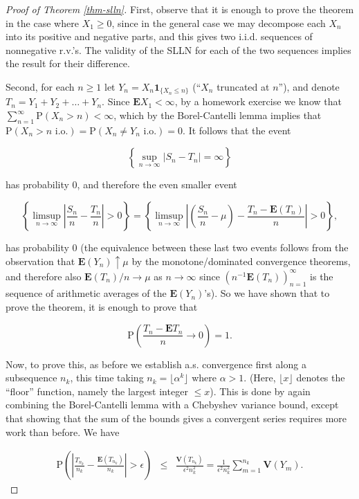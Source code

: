 \documentclass[11pt]{report}
\theoremstyle{plain}
\theoremstyle{definition}
\begin{document}
\begin{proof}[Proof of Theorem \ref{thm-slln}]
First, observe that it is enough to prove the theorem
in the case where $X_1\ge 0$, since in the general
case we may decompose each $X_n$ into its positive
and negative parts, and this gives two i.i.d.
sequences of nonnegative r.v.'s. The validity of the
SLLN for each of the two sequences implies the result
for their difference.

Second, for each $n\ge 1$ let
$Y_n = X_n \mathbf{1}_{\{X_n\le n\}}$ (``$X_n$
truncated at $n$''), and denote
$T_n=Y_1+Y_2+\ldots +Y_n$. Since
$\mathbf{E} X_1<\infty$, by a homework exercise we
know that
$\sum_{n=1}^\infty \mathrm{P}(X_n> n)<\infty$, which
by the Borel-Cantelli lemma implies that
$\mathrm{P}(X_n>n\textrm{ i.o.}) = \mathrm{P}(X_n\neq
Y_n\textrm{ i.o.}) = 0$.
It follows that the event

\[
\left\{ \sup_{n\to\infty} |S_n-T_n|=\infty \right\}
\]

has probability 0, and therefore the even smaller
event

\[
\left\{ \limsup_{n\to\infty} \left|\frac{S_n}{n}-\frac{T_n}{n} \right|>0 \right\}=
\left\{ \limsup_{n\to\infty} \left|\left(\frac{S_n}{n}-\mu\right)-\frac{T_n-\mathbf{E}(T_n)}{n} \right|>0 \right\},
\]

has probability 0 (the equivalence between these
last two events follows from the observation that
$\mathbf{E}(Y_n)\uparrow \mu$ by the
monotone/dominated convergence theorems, and therefore
also $\mathbf{E}(T_n)/n\to\mu$ as $n\to\infty$ since
$(n^{-1} \mathbf{E}(T_n))_{n=1}^\infty$ is the
sequence of arithmetic averages of the
$\mathbf{E}(Y_n)$'s). So we have shown that to prove
the theorem, it is enough to prove that

\[
\mathrm{P}\left(\frac{T_n-\mathbf{E} T_n}{n}\to0\right) = 1.
\]

Now, to prove this, as before we establish a.s.
convergence first along a subsequence $n_k$, this
time taking $n_k = \lfloor \alpha^k \rfloor$ where
$\alpha>1$. (Here, $\lfloor x\rfloor$ denotes the
``floor'' function, namely the largest integer
$\le x$). This is done by again combining the
Borel-Cantelli lemma with a Chebyshev variance bound,
except that showing that the sum of the bounds gives a
convergent series requires more work than before. We
have

\begin{eqnarray*}
\mathrm{P}\left(\left|\frac{T_{n_k}}{n_k} - \frac{\mathbf{E}(T_{n_k})}{n_k}\right| > \epsilon\right)
&\le&
\frac{\mathbf{V}(T_{n_k})}{\epsilon^2 n_k^2}
= \frac{1}{\epsilon^2 n_k^2} \sum_{m=1}^{n_k} \mathbf{V}(Y_m).
\end{eqnarray*}


\end{proof}
\end{document}
